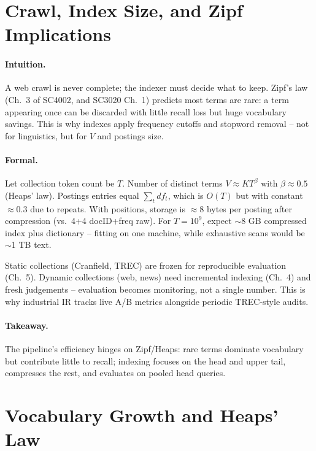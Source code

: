 \section{Crawl, Index Size, and Zipf Implications}\label{sec:crawl-size}
\paragraph{Intuition.} A web crawl is never complete; the indexer must decide what to keep. Zipf's law (Ch.~3 of SC4002, and SC3020 Ch.~1) predicts most terms are rare: a term appearing once can be discarded with little recall loss but huge vocabulary savings. This is why indexes apply frequency cutoffs and stopword removal -- not for linguistics, but for $V$ and postings size.

\paragraph{Formal.} Let collection token count be $T$. Number of distinct terms $V\approx K T^{\beta}$ with $\beta\approx0.5$ (Heaps' law). Postings entries equal $\sum_{t} df_t$, which is $O(T)$ but with constant $\approx 0.3$ due to repeats. With positions, storage is $\approx 8$ bytes per posting after compression (vs.\ 4+4 docID+freq raw). For $T=10^9$, expect $\sim$8 GB compressed index plus dictionary -- fitting on one machine, while exhaustive scans would be $\sim$1 TB text.

\begin{remark}
Static collections (Cranfield, TREC) are frozen for reproducible evaluation (Ch.~5). Dynamic collections (web, news) need incremental indexing (Ch.~4) and fresh judgements -- evaluation becomes monitoring, not a single number. This is why industrial IR tracks live A/B metrics alongside periodic TREC-style audits.
\end{remark}

\paragraph{Takeaway.} The pipeline's efficiency hinges on Zipf/Heaps: rare terms dominate vocabulary but contribute little to recall; indexing focuses on the head and upper tail, compresses the rest, and evaluates on pooled head queries.


\section{Vocabulary Growth and Heaps' Law}\label{sec:heaps}
